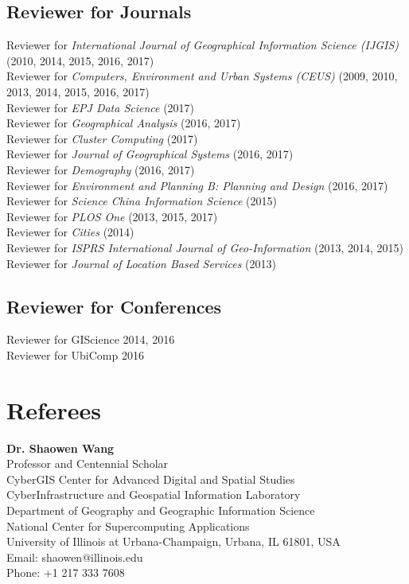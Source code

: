 \documentclass[11pt, a4paper]{article}
\begin{document}
\subsection*{Reviewer for Journals}
Reviewer for \emph{International Journal of Geographical Information Science (IJGIS)} (2010, 2014, 2015, 2016, 2017)\\
Reviewer for \emph{Computers, Environment and Urban Systems (CEUS)} (2009, 2010, 2013, 2014, 2015, 2016, 2017)\\
Reviewer for \emph{EPJ Data Science} (2017)\\
Reviewer for \emph{Geographical Analysis} (2016, 2017)\\
Reviewer for \emph{Cluster Computing} (2017)\\
Reviewer for \emph{Journal of Geographical Systems} (2016, 2017)\\
Reviewer for \emph{Demography} (2016, 2017)\\
Reviewer for \emph{Environment and Planning B: Planning and Design} (2016, 2017)\\
Reviewer for \emph{Science China Information Science} (2015)\\
Reviewer for \emph{PLOS One} (2013, 2015, 2017)\\
Reviewer for \emph{Cities} (2014)\\
Reviewer for \emph{ISPRS International Journal of Geo-Information} (2013, 2014, 2015)\\
Reviewer for \emph{Journal of Location Based Services} (2013)
\subsection*{Reviewer for Conferences}
Reviewer for GIScience {2014, 2016}\\
Reviewer for UbiComp {2016}

\section*{Referees}
\noindent
\textbf{Dr. Shaowen Wang}\\
Professor and Centennial Scholar\\
CyberGIS Center for Advanced Digital and Spatial Studies\\
CyberInfrastructure and Geospatial Information Laboratory\\
Department of Geography and Geographic Information Science\\
National Center for Supercomputing Applications\\
University of Illinois at Urbana-Champaign, Urbana, IL 61801, USA\\
Email: shaowen@illinois.edu\\
Phone: +1 217 333 7608\\
\end{document}
